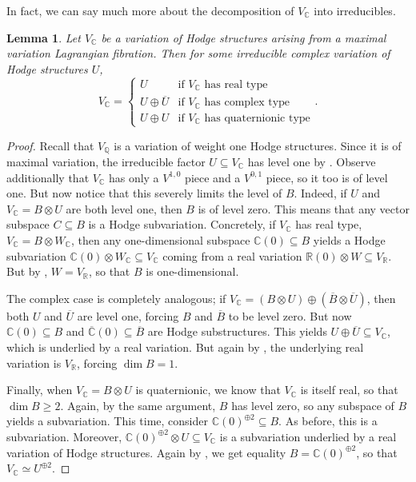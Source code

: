 \documentclass[12pt]{amsart}
\newcommand{\R}{\mathbb{R}}
\newcommand{\Q}{\mathbb{Q}}
\newcommand{\C}{\mathbb{C}}
\newtheorem{lemma}[theorem]{Lemma}
\theoremstyle{definition}
\theoremstyle{remark}
\numberwithin{equation}{section}
\begin{document}
In fact, we can say much more about the decomposition of \(V_\C\) into irreducibles.

\begin{lemma} \label{mv-rep-classification}
    Let $V_\C$ be a variation of Hodge structures arising from a maximal variation
    Lagrangian fibration. Then for some irreducible complex variation of Hodge
    structures $U$,
    \begin{equation*}
        V_\C = \begin{cases}
        U & \text{if } V_\C \text{ has real type}\\
        U \oplus \overline{U} & \text{if } V_\C \text{ has complex type}\\
        U \oplus U & \text{if } V_\C \text{ has quaternionic type}
    \end{cases}.
    \end{equation*}
\end{lemma}

\begin{proof}
Recall that $V_\Q$ is a variation of weight one Hodge structures. Since it is of
maximal variation, the irreducible factor \(U \subseteq V_\C\) has level one by 
\cite[Lemma 4]{bak22}. Observe additionally that \(V_\C\) has only a
\(V^{1,0}\) piece and a \(V^{0,1}\) piece, so it too is of level one.
But now notice that this severely limits the level of $B$.
Indeed, if $U$ and $V_\C = B \otimes U$ are both level one, then $B$ is of level zero.
This means that any vector subspace \(C \subseteq B\) is a Hodge subvariation.
Concretely, if \(V_\C\) has real type, \(V_\C = B \otimes W_\C\), then any 
one-dimensional subspace \(\C(0) \subseteq B\) yields a Hodge subvariation
\(\C(0) \otimes W_\C \subseteq V_\C\) coming from a real variation 
\(\R(0) \otimes W \subseteq V_\R\). But by , 
\(W = V_\R\), so that \(B\) is one-dimensional.

The complex case is completely analogous; if
\(V_\C = (B \otimes U) \oplus (\overline{B} \otimes \overline{U})\), then 
both \(U\) and \(\overline{U}\) are level one, forcing \(B\) and \(\overline{B}\)
to be level zero. But now \(\C(0) \subseteq B\) and
\(\overline{\C}(0) \subseteq \overline{B}\) are Hodge substructures. This yields 
\(U \oplus \overline{U} \subseteq V_\C\), which is underlied by a real variation.
But again by , the underlying real variation is \(V_\R\),
forcing \(\dim B = 1\).

Finally, when \(V_\C = B \otimes U\) is quaternionic, we know that \(V_\C\) 
is itself real, so that \(\dim B \geq 2\). Again, by the same argument, \(B\) 
has level zero, so any subspace of \(B\) yields a subvariation. This time, 
consider \(\C(0)^{\oplus 2} \subseteq B\). As before, this is a subvariation. 
Moreover, \(\C(0)^{\oplus 2} \otimes U \subseteq V_\C\) is a subvariation 
underlied by a real variation of Hodge structures. Again by 
, we get equality \(B = \C(0)^{\oplus 2}\), 
so that \(V_\C \simeq U^{\oplus 2}\).
\end{proof}
\end{document}
